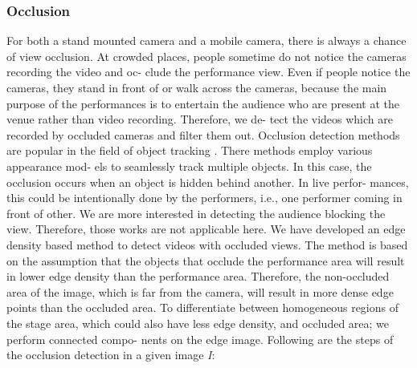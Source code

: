 \documentclass{sig-alternate}
\begin{document}
\subsubsection{Occlusion}
For both a stand mounted camera and a mobile camera, there
is always a chance of view occlusion. At crowded places, people
sometime do not notice the cameras recording the video and oc-
clude the performance view. Even if people notice the cameras,
they stand in front of or walk across the cameras, because the main
purpose of the performances is to entertain the audience who are
present at the venue rather than video recording. Therefore, we de-
tect the videos which are recorded by occluded cameras and filter
them out.
Occlusion detection methods are popular in the field of object
tracking \cite{salas:thirteen}\cite{salas:nineteen}. There methods employ various appearance mod-
els to seamlessly track multiple objects. In this case, the occlusion
occurs when an object is hidden behind another. In live perfor-
mances, this could be intentionally done by the performers, i.e.,
one performer coming in front of other. We are more interested in
detecting the audience blocking the view. Therefore, those works
are not applicable here.
We have developed an edge density based method to detect videos
with occluded views. The method is based on the assumption that
the objects that occlude the performance area will result in lower
edge density than the performance area. Therefore, the non-occluded
area of the image, which is far from the camera, will result in more
dense edge points than the occluded area. To differentiate between
homogeneous regions of the stage area, which could also have less
edge density, and occluded area; we perform connected compo-
nents on the edge image. Following are the steps of the occlusion
detection in a given image \textit{I}:
\end{document}
